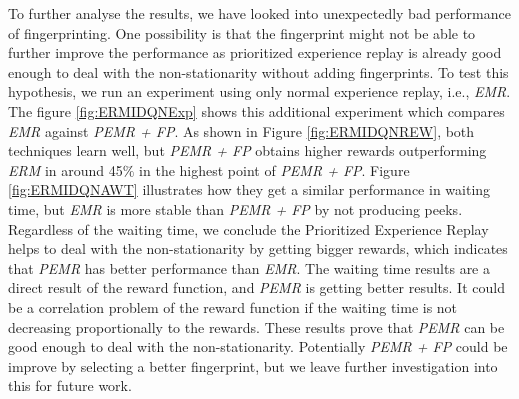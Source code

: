 \documentclass{llncs}
\begin{document}
To further analyse the results, we have looked into unexpectedly bad performance of fingerprinting. One possibility is that the fingerprint might not be able to further improve the performance as prioritized experience replay is already good enough to deal with the non-stationarity without adding fingerprints. To test this hypothesis, we run an experiment using only normal experience replay, i.e., \textit{EMR}. The figure \ref{fig:ERMIDQNExp} shows this additional experiment which compares \textit{EMR} against \textit{PEMR + FP}. As shown in Figure \ref{fig:ERMIDQNREW}, both techniques learn well, but \textit{PEMR + FP} obtains higher rewards outperforming \textit{ERM} in around 45$\%$ in the highest point of \textit{PEMR + FP}. Figure \ref{fig:ERMIDQNAWT} illustrates how they get a similar performance in waiting time, but \textit{EMR} is  more stable than \textit{PEMR + FP} by not producing peeks. Regardless of the waiting time, we conclude the Prioritized Experience Replay helps to deal with the non-stationarity by getting bigger rewards, which indicates that \textit{PEMR} has better performance than \textit{EMR}. The waiting time results are a direct result of the reward function, and \textit{PEMR} is getting better results. It could be a correlation problem of the reward function if the waiting time is not decreasing proportionally to the rewards. These results prove that \textit{PEMR} can be good enough to deal with the non-stationarity. Potentially \textit{PEMR + FP} could be improve by selecting a better fingerprint, but we leave further investigation into this for future work.
\end{document}
